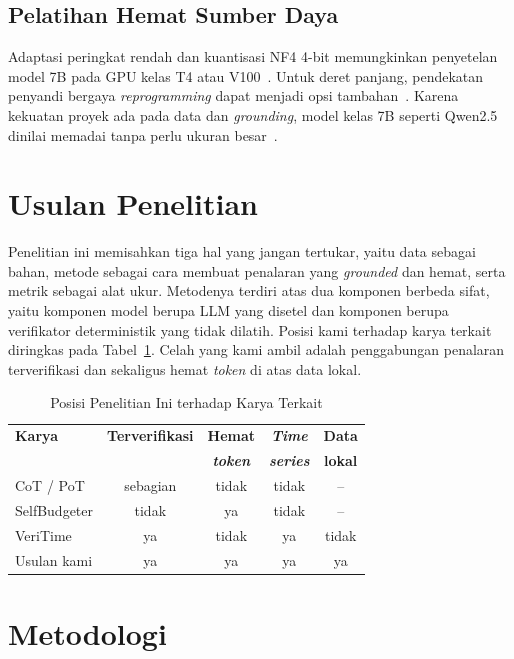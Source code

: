 \documentclass[10pt,a4paper,twocolumn]{article}
\begin{document}
\subsection{Pelatihan Hemat Sumber Daya}
Adaptasi peringkat rendah dan kuantisasi NF4 4-bit memungkinkan penyetelan model
7B pada GPU kelas T4 atau V100~\cite{lora2022,qlora2023}. Untuk deret panjang,
pendekatan penyandi bergaya \textit{reprogramming} dapat menjadi opsi
tambahan~\cite{timellm2024}. Karena kekuatan proyek ada pada data dan
\textit{grounding}, model kelas 7B seperti Qwen2.5 dinilai memadai tanpa perlu
ukuran besar~\cite{qwen2024}.

\section{Usulan Penelitian}
Penelitian ini memisahkan tiga hal yang jangan tertukar, yaitu data sebagai
bahan, metode sebagai cara membuat penalaran yang \textit{grounded} dan hemat,
serta metrik sebagai alat ukur. Metodenya terdiri atas dua komponen berbeda
sifat, yaitu komponen model berupa LLM yang disetel dan komponen berupa
verifikator deterministik yang tidak dilatih. Posisi kami terhadap karya terkait
diringkas pada Tabel~\ref{tab:posisi}. Celah yang kami ambil adalah penggabungan
penalaran terverifikasi dan sekaligus hemat \textit{token} di atas data lokal.

\begin{table}[t]
\centering
\caption{Posisi Penelitian Ini terhadap Karya Terkait}
\label{tab:posisi}
\footnotesize
\begin{tabular}{@{}lcccc@{}}
\toprule
\textbf{Karya} & \textbf{Terverifikasi} & \textbf{Hemat} & \textbf{\textit{Time}} & \textbf{Data} \\
 & & \textbf{\textit{token}} & \textbf{\textit{series}} & \textbf{lokal} \\
\midrule
CoT / PoT \cite{cot2022,pal2023} & sebagian & tidak & tidak & -- \\
SelfBudgeter \cite{selfbudgeter2025} & tidak & ya & tidak & -- \\
VeriTime \cite{veritime2026} & ya & tidak & ya & tidak \\
Usulan kami & ya & ya & ya & ya \\
\bottomrule
\end{tabular}
\end{table}

\section{Metodologi}
\end{document}

